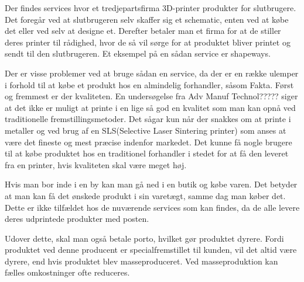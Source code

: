 Der findes services hvor et tredjepartsfirma 3D-printer produkter for slutbrugere. Det foregår ved at slutbrugeren selv skaffer sig et schematic, enten ved at købe det eller ved selv at designe et. Derefter betaler man et firma for at de stiller deres printer til rådighed, hvor de så vil sørge for at produktet bliver printet og sendt til den slutbrugeren. Et eksempel på en sådan service er shapeways. \autocite{_shapeways_????}

Der er visse problemer ved at bruge sådan en service, da der er en række ulemper i forhold til at købe et produkt hos en almindelig forhandler, såsom Fakta. Først og fremmest er der kvaliteten. En undersøgelse fra Adv Manuf Technol????? siger at det ikke er muligt at printe i en lige så god en kvalitet som man kan opnå ved traditionelle fremstillingsmetoder. Det sågar kun når der snakkes om at printe i metaller og ved brug af en SLS(Selective Laser Sintering printer) som anses at være det fineste og mest præcise indenfor markedet. Det kunne få nogle brugere til at købe  produktet hos en traditionel forhandler i stedet for at få den leveret fra en printer, hvis kvaliteten skal være meget høj.

Hvis man bor inde i en by kan man gå ned i en butik og købe varen. Det betyder at man kan få det ønskede produkt i sin varetægt, samme dag man køber det. Dette er ikke tilfældet hos de nuværende services som kan findes, da de alle levere deres udprintede produkter med posten.

Udover dette, skal man også betale porto, hvilket gør produktet dyrere. Fordi produktet ved denne producent er specialfremstillet til kunden, vil det altid være dyrere, end hvis produktet blev masseproduceret. Ved masseproduktion kan fælles omkostninger ofte reduceres.